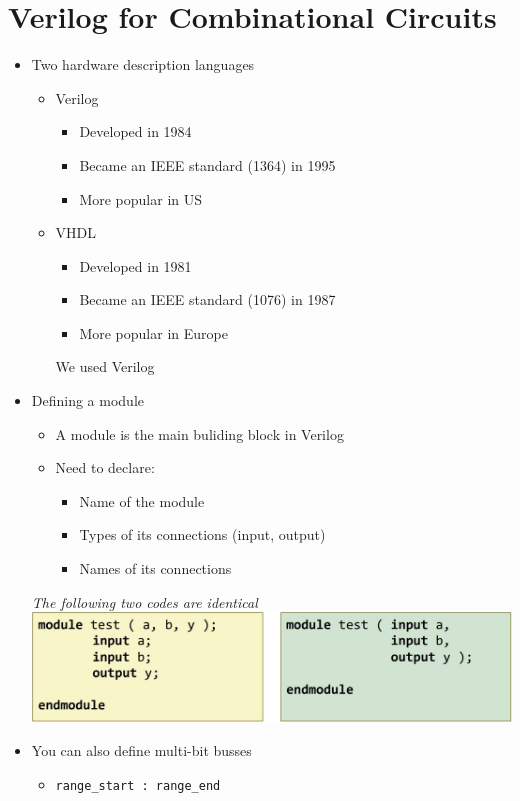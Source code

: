 \documentclass[a4paper]{article}
\begin{document}
\section{Verilog for Combinational Circuits}
\begin{itemize}
\item Two hardware description languages
\begin{itemize}
\item Verilog
\begin{itemize}
\item Developed in 1984
\item Became an IEEE standard (1364) in 1995
\item More popular in US
\end{itemize}
\item VHDL
\begin{itemize}
\item Developed in 1981
\item Became an IEEE standard (1076) in 1987
\item More popular in Europe
\end{itemize}
We used Verilog
\end{itemize}
\item Defining a module
\begin{itemize}
\item A module is the main buliding block in Verilog
\item Need to declare:
\begin{itemize}
\item Name of the module
\item Types of its connections (input, output)
\item Names of its connections
\end{itemize}
\end{itemize}
\textit{The following two codes are identical}\\
\includegraphics[scale=0.25]{Figures/DefiningModuleExample2ways.jpg}
\item You can also define multi-bit busses
\begin{itemize}
\item \lbrack \texttt{range\_start : range\_end}\rbrack

\end{itemize}
\end{itemize}
\end{document}
